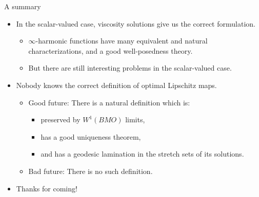 \documentclass[10pt]{beamer}
\begin{document}
\begin{frame}{A summary}
\begin{itemize}
\item In the scalar-valued case, viscosity solutions give us the correct formulation.
\begin{itemize}
\item $\infty$-harmonic functions have many equivalent and natural characterizations, and a good well-posedness theory.
\item But there are still interesting problems in the scalar-valued case.
\end{itemize}
\item Nobody knows the correct definition of optimal Lipschitz maps.
\begin{itemize}
    \item Good future: There is a natural definition which is:
    \begin{itemize}
    \item preserved by $W^1(BMO)$ limits,
    \item has a good uniqueness theorem,
    \item and has a geodesic lamination in the stretch sets of its solutions.
    \end{itemize}
    \item Bad future: There is no such definition.
\end{itemize}
\item Thanks for coming!
\end{itemize}
\end{frame}
\end{document}

